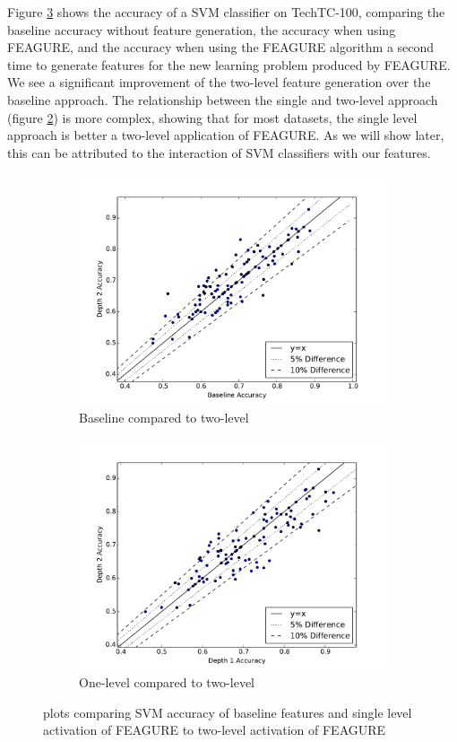 \documentclass[twoside,11pt]{article}
\theoremstyle{definition}
\begin{document}
Figure \ref{fig:svm_lvl2} shows the accuracy of a SVM classifier on TechTC-100, comparing the baseline accuracy without feature generation, the accuracy when using FEAGURE, and the accuracy when using the FEAGURE algorithm a second time to generate features for the new learning problem produced by FEAGURE.
We see a significant improvement of the two-level feature generation over the baseline approach. The relationship between the single and two-level approach (figure \ref{fig:lvl1_vs_lvl2}) is more complex, showing that for most datasets, the single level approach is better a two-level application of FEAGURE. As we will show later, this can be attributed to the interaction of SVM classifiers with our features. 

\begin{figure}
	\begin{subfigure}{.5\textwidth}
		\centering
		\includegraphics[width=.9\linewidth]{svm_08_base_vs_lvl2.pdf}
		\caption{Baseline compared to two-level}
		\label{fig:base_vs_lvl2}
	\end{subfigure}%
	\begin{subfigure}{.5\textwidth}
		\centering
		\includegraphics[width=.9\linewidth]{svm_08_lvl1_vs_lvl2.pdf}
		\caption{One-level compared to two-level}
		\label{fig:lvl1_vs_lvl2}
	\end{subfigure}
	\caption{plots comparing SVM accuracy of baseline features and single level activation of FEAGURE to two-level activation of FEAGURE}
	\label{fig:svm_lvl2}
\end{figure}
\end{document}
